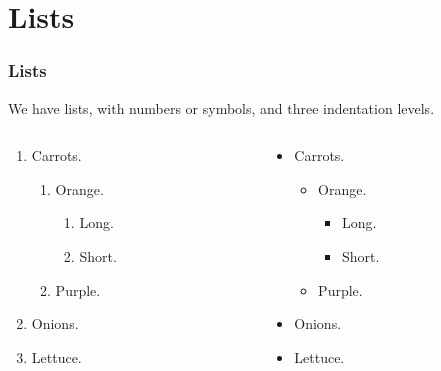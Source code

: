 \documentclass{beamer}
\begin{document}
\section{Lists}

\begin{frame}
    \frametitle{Lists}

    We have lists, with numbers or symbols, and three indentation levels.

    \begin{columns}
        \begin{column}{0.5\textwidth}
            \begin{enumerate}
                \item Carrots.
                      \begin{enumerate}
                          \item Orange.
                                \begin{enumerate}
                                    \item Long.
                                    \item Short.
                                \end{enumerate}
                          \item Purple.
                      \end{enumerate}
                \item Onions.
                \item Lettuce.
            \end{enumerate}
        \end{column}
        \begin{column}{0.5\textwidth}  %
            \begin{itemize}
                \item Carrots.
                      \begin{itemize}
                          \item Orange.
                                \begin{itemize}
                                    \item Long.
                                    \item Short.
                                \end{itemize}
                          \item Purple.
                      \end{itemize}
                \item Onions.
                \item Lettuce.
            \end{itemize}
        \end{column}
    \end{columns}

\end{frame}
\end{document}
